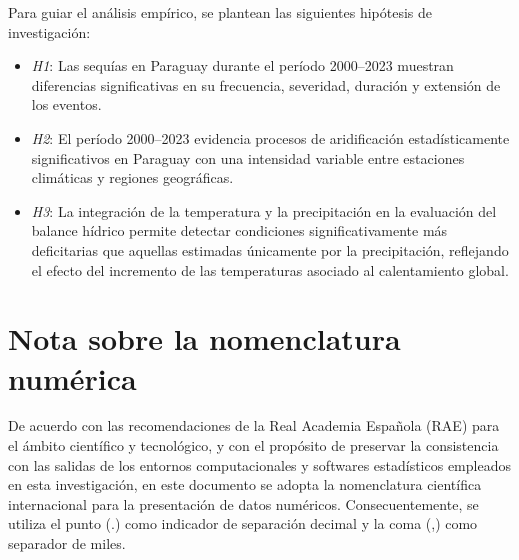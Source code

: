 Para guiar el análisis empírico, se plantean las siguientes hipótesis de investigación:
\begin{itemize}
    \item \textit{H1}: Las sequías en Paraguay durante el período 2000--2023 muestran diferencias significativas en su frecuencia, severidad, duración y extensión de los eventos.
    \item \textit{H2}: El período 2000--2023 evidencia procesos de aridificación estadísticamente significativos en Paraguay con una intensidad variable entre estaciones climáticas y regiones geográficas.
    \item \textit{H3}: La integración de la temperatura y la precipitación en la evaluación del balance hídrico permite detectar condiciones significativamente más deficitarias que aquellas estimadas únicamente por la precipitación, reflejando el efecto del incremento de las temperaturas asociado al calentamiento global.
\end{itemize}

\section{Nota sobre la nomenclatura numérica}

De acuerdo con las recomendaciones de la Real Academia Española (RAE) para el ámbito científico y tecnológico, y con el propósito de preservar la consistencia con las salidas de los entornos computacionales y softwares estadísticos empleados en esta investigación, en este documento se adopta la nomenclatura científica internacional para la presentación de datos numéricos. Consecuentemente, se utiliza el punto (.) como indicador de separación decimal y la coma (,) como separador de miles.